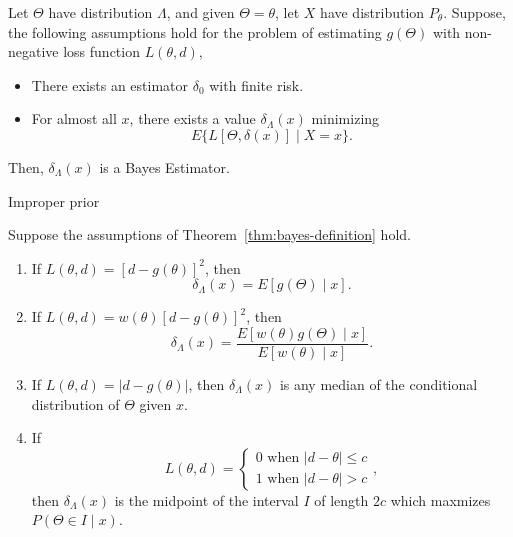 \begin{theorem}\label{thm:bayes-definition}
	Let \(\Theta\) have distribution \(\Lambda\), and given \(\Theta=\theta\), let \(X\) have distribution \(P_{\theta}\). Suppose, the following assumptions hold for the problem of estimating \(g\left(\Theta\right)\) with non-negative loss function \(L\left(\theta,d\right)\),
	\begin{itemize}
		\item There exists an estimator \(\delta_0\) with finite risk.
		\item For almost all \(x\), there exists a value \(\delta_{\Lambda}\left(x\right)\) minimizing
		      \begin{equation}
			      E\{L[\Theta,\delta\left(x\right)] \mid X=x\}.
		      \end{equation}
	\end{itemize}
	Then, \(\delta_{\Lambda}\left(x\right)\) is a Bayes Estimator.
\end{theorem}
\begin{remark}
	Improper prior
\end{remark}

\begin{corollary}
	Suppose the assumptions of Theorem~\ref{thm:bayes-definition} hold.
	\begin{enumerate}
		\item If \(L\left(\theta,d\right)=[d-g\left(\theta\right)]^2\), then
		      \begin{equation}
			      \delta_{\Lambda}\left(x\right)=E[g\left(\Theta\right) \mid x].
		      \end{equation}
		\item If \(L\left(\theta,d\right)=w\left(\theta\right)[d-g\left(\theta\right)]^2\), then
		      \begin{equation}
			      \delta_{\Lambda}\left(x\right)=\frac{E[w\left(\theta\right)g\left(\Theta\right) \mid x]}{E[w\left(\theta\right) \mid x]}.
		      \end{equation}
		\item If \(L\left(\theta,d\right)=|d-g\left(\theta\right)|\), then \(\delta_\Lambda\left(x\right)\) is any median of the conditional distribution of \(\Theta\) given \(x\).
		\item If
		      \begin{equation*}
			      L(\theta, d)=\left\{
			      \begin{array}{l}
				      0 \text { when }|d-\theta| \leq c \\
				      1 \text { when }|d-\theta|>c
			      \end{array}
			      \right.,
		      \end{equation*}
		      then \(\delta_\Lambda\left(x\right)\) is the midpoint of the interval \(I\) of length \(2c\) which maxmizes \(P\left(\Theta\in I\mid x\right)\).
	\end{enumerate}
\end{corollary}


